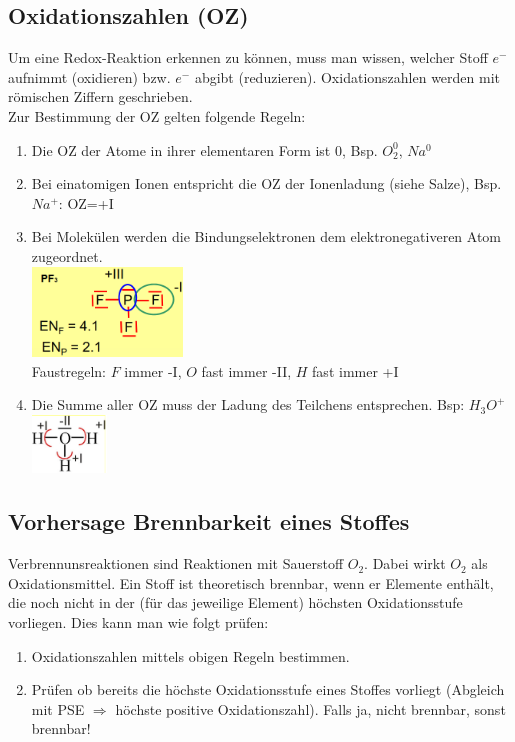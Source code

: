 \subsection{Oxidationszahlen (OZ)}
Um eine Redox-Reaktion erkennen zu können, muss man wissen, welcher Stoff $e^-$ aufnimmt (oxidieren) bzw. $e^-$ abgibt (reduzieren). Oxidationszahlen werden mit römischen Ziffern geschrieben. \\
Zur Bestimmung der OZ gelten folgende Regeln:
\vspace*{-0.1cm}
\begin{enumerate}[nolistsep]
	\item Die OZ der Atome in ihrer elementaren Form ist 0, Bsp. $O_2^0$, $Na^0$
	\item Bei einatomigen Ionen entspricht die OZ der Ionenladung (siehe Salze), Bsp. $Na^+$: OZ=+I
	\item Bei Molekülen werden die Bindungselektronen dem elektronegativeren Atom zugeordnet. \\
	\includegraphics[width=4cm]{images/RedoxRegel3.png}\\
	Faustregeln: $F$ immer -I, $O$ fast immer -II, $H$ fast immer +I
	\item Die Summe aller OZ muss der Ladung des Teilchens entsprechen. Bsp: $H_3O^+$\\
	\includegraphics[width=2cm]{images/RedoxRegel4.png}
\end{enumerate}

\subsection{Vorhersage Brennbarkeit eines Stoffes}
Verbrennunsreaktionen sind Reaktionen mit Sauerstoff $O_2$. Dabei wirkt $O_2$ als Oxidationsmittel. Ein Stoff ist theoretisch brennbar, wenn er Elemente enthält, die noch nicht in der (für das jeweilige Element) höchsten Oxidationsstufe vorliegen. Dies kann man wie folgt prüfen:
\begin{enumerate}[nolistsep]
\item Oxidationszahlen mittels obigen Regeln bestimmen.
\item Prüfen ob bereits die höchste Oxidationsstufe eines Stoffes vorliegt (Abgleich mit PSE $\Rightarrow$ höchste positive Oxidationszahl). Falls ja, nicht brennbar, sonst brennbar!
\end{enumerate}

